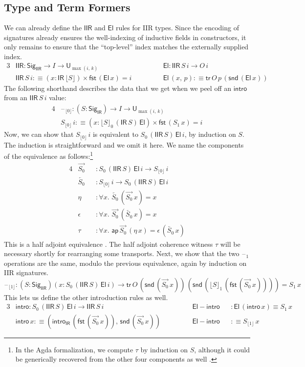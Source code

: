 \documentclass[acmsmall,screen,review,anonymous]{acmart}
\newcommand{\msf}[1]{{\mathsf{#1}}}
\newcommand{\U}{\msf{U}}
\newcommand{\El}{\msf{El}}
\newcommand{\Sig}{\msf{Sig}}
\newcommand{\blank}{{\mathord{\hspace{1pt}\text{--}\hspace{1pt}}}}
\newcommand{\IR}{\msf{IR}}
\newcommand{\intro}{\msf{intro}}
\newcommand{\tr}{\msf{tr}}
\newcommand{\fst}{\msf{fst}}
\newcommand{\snd}{\msf{snd}}
\newcommand{\IIR}{\msf{IIR}}
\newcommand{\Sigr}[1]{\lfloor #1 \rfloor}
\newcommand{\floord}[1]{\lfloor #1 \rfloor}
\newcommand{\ora}[1]{\overrightarrow{#1}}
\newcommand{\ola}[1]{\overleftarrow{#1}}
\newcommand{\ap}{\msf{ap}}
\begin{document}
\subsection{Type and Term Formers} We can already define the $\IIR$ and $\El$ rules for IIR types. Since the encoding of signatures
already ensures the well-indexing of inductive fields in constructors, it only remains to ensure
that the ``top-level'' index matches the externally supplied index.
\begin{alignat*}{3}
  &\IIR : \Sig_\IIR \to I \to \U_{\max(i,\,k)}                         && \El : \IIR\,S\,i \to O\,i \\
  &\IIR\,S\,i :\equiv (x : \IR\,\Sigr{S}) \times \fst\,(\El\,x) = i \hspace{3em}&& \El\,(x,\,p) :\equiv \tr\,O\,p\,(\snd\,(\El\,x))
\end{alignat*}
The following shorthand describes the data that we get when we peel off an $\intro$ from an $\IIR\,S\,i$ value:
\begin{alignat*}{4}
  &\blank_{\floord{0}} : (S : \Sig_\IR) \to I \to \U_{\max(i,\,k)}\\
  &S_{\floord{0}}\,i :\equiv (x : \floord{S}_0\,(\IR\,S)\,\El) \times \fst\,(S_1\,x) = i
\end{alignat*}
Now, we can show that $S_{\floord{0}}\,i$ is equivalent to $S_0\,(\IIR\,S)\,\El\,i$, by induction on
$S$. The induction is straightforward and we omit it here. We name the components of the equivalence
as follows:\footnote{In the Agda formalization, we
compute $\tau$ by induction on $S$, although it could be generically recovered from the other
four components as well \cite{TODO}.}
\begin{alignat*}{4}
  &\ora{S_0} &&: S_0\,(\IIR\,S)\,\El\,i \to S_{\floord{0}}\,i \\
  &\ola{S_0} &&: S_{\floord{0}}\,i \to S_0\,(\IIR\,S)\,\El\,i \\
  &\eta      &&: \forall x.\,\,\ola{S_0}\,(\ora{S_0}\,x) = x \\
  &\epsilon  &&: \forall x.\,\,\ora{S_0}\,(\ola{S_0}\,x) = x \\
  &\tau      &&: \forall x.\,\,\ap\,\ora{S_0}\,(\eta\,x) = \epsilon\,(\ola{S_0}\,x)
\end{alignat*}
This is a half adjoint equivalence \cite{TODO}. The half adjoint coherence witness $\tau$ will be
necessary shortly for rearranging some transports. Next, we show that the two $\blank_1$ operations are the same, modulo
the previous equivalence, again by induction on IIR signatures.
\[\blank_{\floord{1}} : (S : \Sig_\IIR)(x : S_0\,(\IIR\,S)\,\El\,i) \to \tr\,O\,(\snd\,(\ora{S_0}\,x))\,(\snd\,(\floord{S}_1\,(\fst\,(\ora{S_0}\,x)))) = S_1\,x\]
This lets us define the other introduction rules as well.
\begin{alignat*}{3}
  &\intro    : S_0\,(\IIR\,S)\,\El\,i \to \IIR\,S\,i && \msf{El\!\!-\!\!intro} && : \El\,(\intro\,x) \equiv S_1\,x \\
  &\intro\,x :\equiv (\intro_\IR\,(\fst\,(\ora{S_0}\,x)),\,\snd\,(\ora{S_0}\,x)) \quad\quad\quad&& \msf{El\!\!-\!\!intro} && :\equiv S_{\floord{1}}\,x
\end{alignat*}
\end{document}
